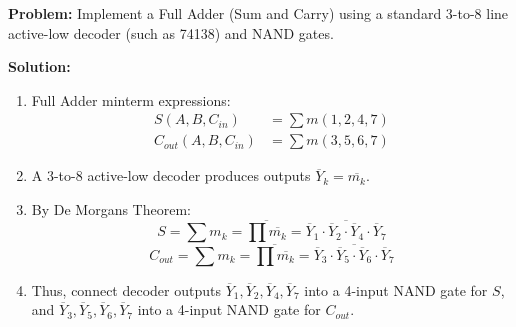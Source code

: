 \begin{examplebox}
\textbf{Problem:} Implement a Full Adder (Sum and Carry) using a standard 3-to-8 line active-low decoder (such as 74138) and NAND gates.

\textbf{Solution:}
\begin{enumerate}
    \item Full Adder minterm expressions:
    \begin{align}
    S(A, B, C_{in}) &= \sum m(1, 2, 4, 7) \\
    C_{out}(A, B, C_{in}) &= \sum m(3, 5, 6, 7)
    \end{align}
    \item A 3-to-8 active-low decoder produces outputs $\overline{Y}_k = \overline{m_k}$.
    \item By De Morgan\textquotesingle s Theorem:
    \begin{equation}
    S = \sum m_k = \overline{\prod \overline{m_k}} = \overline{\overline{Y}_1 \cdot \overline{Y}_2 \cdot \overline{Y}_4 \cdot \overline{Y}_7}
    \end{equation}
    \begin{equation}
    C_{out} = \sum m_k = \overline{\prod \overline{m_k}} = \overline{\overline{Y}_3 \cdot \overline{Y}_5 \cdot \overline{Y}_6 \cdot \overline{Y}_7}
    \end{equation}
    \item Thus, connect decoder outputs $\overline{Y}_1, \overline{Y}_2, \overline{Y}_4, \overline{Y}_7$ into a 4-input NAND gate for $S$, and $\overline{Y}_3, \overline{Y}_5, \overline{Y}_6, \overline{Y}_7$ into a 4-input NAND gate for $C_{out}$.
\end{enumerate}
\end{examplebox}

